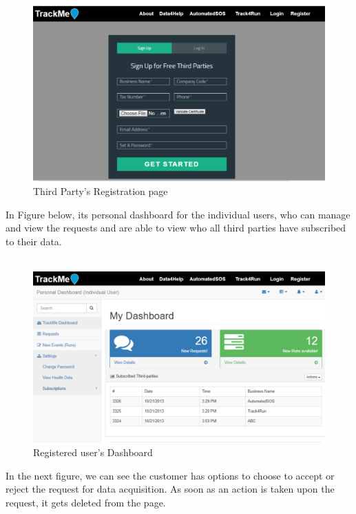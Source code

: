 \documentclass[12pt]{article}
\begin{document}
\begin{figure}[H]
\centering
\includegraphics[scale=0.5]{../Assets/Register_third_party.png}
\caption[UI: Third Party's Registration page]{Third Party's Registration page}
\label{fig:Register_third_party}
\end{figure}

In Figure below, its personal dashboard for the individual users, who can manage and view the requests and are able to view who all third parties have subscribed to their data.\\\\

\begin{figure}[H]
\centering
\includegraphics[scale=0.5]{../Assets/Dashboard_individual.png}
\caption[UI: Registered user's Dashboard]{Registered user's Dashboard}
\label{fig:Dashboard_individual}
\end{figure}

In the next figure, we can see the customer has options to choose to accept or reject the request for data acquisition. As soon as an action is taken upon the request, it gets deleted from the page.
\end{document}
